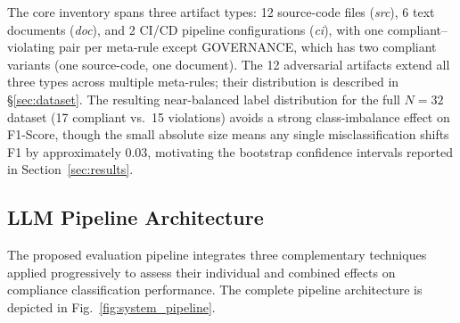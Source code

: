 \documentclass{ieeeaccess}
\begin{document}
The core inventory spans three artifact types: 12 source-code files (\textit{src}), 6 text documents (\textit{doc}), and 2 CI/CD pipeline configurations (\textit{ci}), with one compliant--violating pair per meta-rule except GOVERNANCE, which has two compliant variants (one source-code, one document). The 12 adversarial artifacts extend all three types across multiple meta-rules; their distribution is described in §\ref{sec:dataset}. The resulting near-balanced label distribution for the full $N=32$ dataset (17 compliant vs.\ 15 violations) avoids a strong class-imbalance effect on F1-Score, though the small absolute size means any single misclassification shifts F1 by approximately 0.03, motivating the bootstrap confidence intervals reported in Section~\ref{sec:results}.

\subsection{LLM Pipeline Architecture}
\label{sec:pipeline}

The proposed evaluation pipeline integrates three complementary techniques applied progressively to assess their individual and combined effects on compliance classification performance. The complete pipeline architecture is depicted in Fig.~\ref{fig:system_pipeline}.
\end{document}
